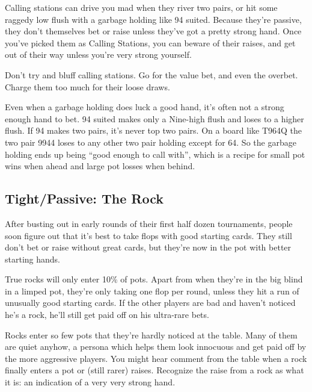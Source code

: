 Calling stations can drive you mad when they river two pairs,
or hit some raggedy low flush with a garbage holding like 94 suited.
Because they're passive, they don't themselves bet or raise unless
they've got a pretty strong hand. Once you've picked them as
Calling Stations, you can beware of their raises, and get out of
their way unless you're very strong yourself.

Don't try and bluff calling stations. Go for the value bet,
and even the overbet. Charge them too much for their loose draws.

Even when a garbage holding does luck a good hand, it's often
not a strong enough hand to bet. 94 suited makes only a Nine-high
flush and loses to a higher flush. If 94 makes two pairs,
it's never top two pairs. On a board like T964Q the two pair 9944
loses to any other two pair holding except for 64. So the garbage
holding ends up being ``good enough to call with'', which is a
recipe for small pot wins when ahead and large pot losses when
behind.

\subsection{Tight/Passive: The Rock}

After busting out in early rounds of their first half dozen
tournaments, people soon figure out that it's best to take flops
with good starting cards. They still don't bet or raise without
great cards, but they're now in the pot with better starting hands.

True rocks will only enter 10\% of pots. Apart from when they're
in the big blind in a limped pot, they're only taking one
flop per round, unless they hit a run of unusually good starting
cards. If the other players are bad and haven't noticed
he's a rock, he'll still get paid off on his ultra-rare bets.


Rocks enter so few pots that they're hardly noticed
at the table. Many of them are quiet anyhow,
a persona which helps them look innocuous and get paid off by the
more aggressive players. You might hear comment from the table
when a rock finally enters a pot or (still rarer) raises. Recognize
the raise from a rock as what it is: an indication of a very very
strong hand.

